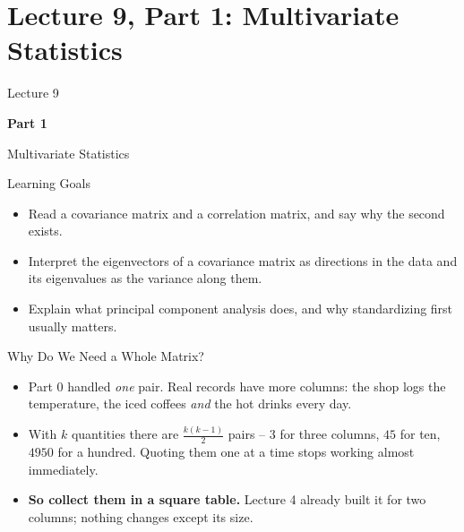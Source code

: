 \section{Lecture 9, Part 1: Multivariate Statistics}

\begin{frame}
\vfill
\centering
{\color{RLBlue}\large Lecture 9}

\vspace{0.3em}
{\color{RLBlue}\Large\bfseries Part 1}

\vspace{0.6em}
{\Large Multivariate Statistics}
\vfill
\end{frame}

\begin{frame}{Learning Goals}
\begin{itemize}
  \item Read a covariance matrix and a correlation matrix, and say why the second exists.
  \pause
  \item Interpret the eigenvectors of a covariance matrix as directions in the data and its eigenvalues as the variance along them.
  \pause
  \item Explain what principal component analysis does, and why standardizing first usually matters.
\end{itemize}
\end{frame}

\begin{frame}{Why Do We Need a Whole Matrix?}
\begin{itemize}
  \item Part 0 handled \emph{one} pair. Real records have more columns: the shop logs the temperature, the iced coffees \emph{and} the hot drinks every day.
  \pause
  \item With $k$ quantities there are $\tfrac{k(k-1)}{2}$ pairs -- $3$ for three columns, $45$ for ten, $4950$ for a hundred. Quoting them one at a time stops working almost immediately.
  \pause
  \item \textbf{So collect them in a square table.} Lecture 4 already built it for two columns; nothing changes except its size.
\end{itemize}
\end{frame}

